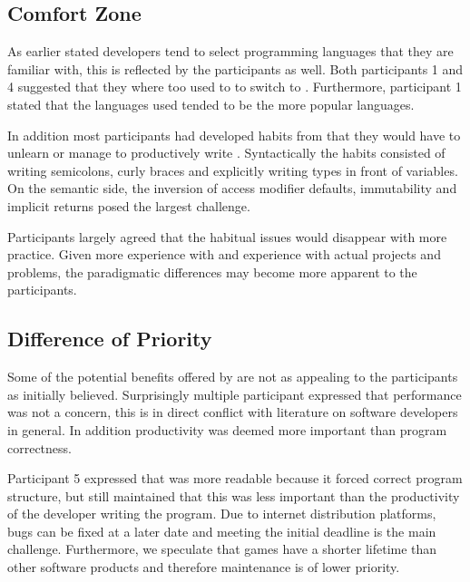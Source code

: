 \subsection{Comfort Zone}
As earlier stated developers tend to select programming languages that they are familiar with\cite{meyerovich2013empirical}, this is reflected by the participants as well. Both participants 1 and 4 suggested that they where too used to \cs to switch to \fs. Furthermore, participant 1 stated that the languages used tended to be the more popular languages.


In addition most participants had developed habits from \cs that they would have to unlearn or manage to productively write \fs. Syntactically the habits consisted of writing semicolons, curly braces and explicitly writing types in front of variables. On the semantic side, the inversion of access modifier defaults, immutability and implicit returns posed the largest challenge.



Participants largely agreed that the habitual issues would disappear with more practice. Given more experience with \fs and experience with actual projects and problems, the paradigmatic differences may become more apparent to the participants.

\subsection{Difference of Priority}
Some of the potential benefits offered by \fs are not as appealing to the participants as initially believed. Surprisingly multiple  participant expressed that performance was not a concern, this is in direct conflict with literature on software developers in general\cite{meyerovich2013empirical}. In addition productivity was deemed more important than program correctness.


Participant 5 expressed that \fs was more readable because it forced correct program structure, but still maintained that this was less important than the productivity of the developer writing the program. Due to internet distribution platforms, bugs can be fixed at a later date and meeting the initial deadline is the main challenge. Furthermore, we speculate that games have a shorter lifetime than other software products and therefore maintenance is of lower priority.
